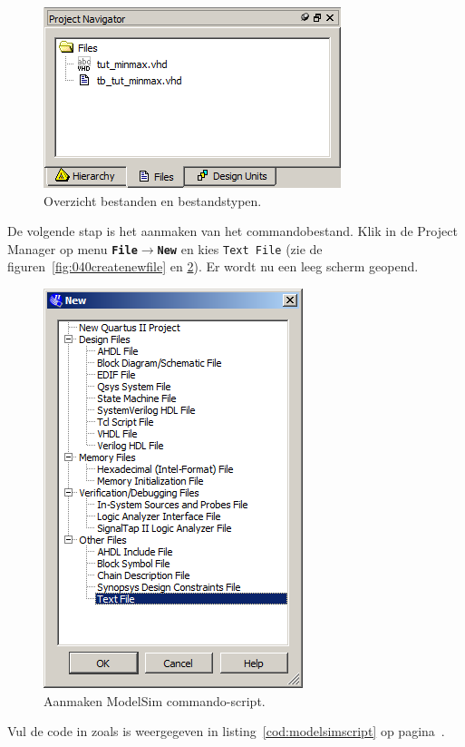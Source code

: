 \documentclass[a4paper,12pt,fleqn,twoside]{book}
\def\tutpicscale{0.455}
\newcommand{\menu}[1]{\texttt{\textbf{#1}}}
\newcommand{\naam}[1]{\texttt{#1}}
\def\pijl{$\rightarrow$}%
\begin{document}
\begin{figure}[H]
\centering
\includegraphics[scale=\tutpicscale]{065projectnavfiletypechanged.png}
\caption{Overzicht bestanden en bestandstypen.}
\label{fig:065projectnavfiletypechanged}
\end{figure}

De volgende stap is het aanmaken van het commandobestand. Klik in de Project
Manager op menu \menu{File\pijl{}New} en kies \naam{Text File} (zie de
figuren~\ref{fig:040createnewfile} en \ref{fig:066newfiledialogbox}). Er wordt
nu een leeg scherm geopend.

\begin{figure}[H]
\centering
\includegraphics[scale=\tutpicscale]{066newfiledialogbox.png}
\caption{Aanmaken ModelSim commando-script.}
\label{fig:066newfiledialogbox}
\end{figure}

Vul de code in zoals is weergegeven in listing~\ref{cod:modelsimscript} op
pagina~\pageref{cod:modelsimscript}.
\end{document}
